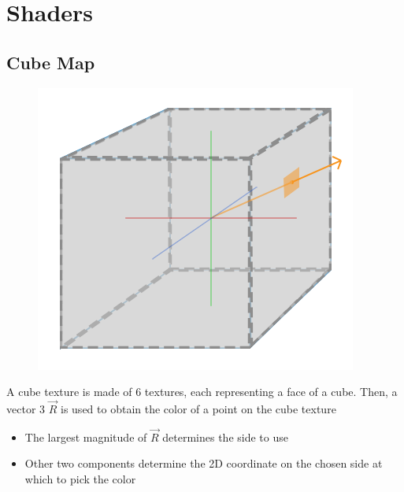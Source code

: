 \section{Shaders}

\subsection{Cube Map}

  \begin{figure}[H]
    \centering
    \includegraphics[width=0.4\columnwidth]{images/textures/shaders/cube-map.png}
  \end{figure}

  A cube texture is made of 6 textures, each representing a face of a cube.
  Then, a vector 3 $ \vec{R} $ is used to obtain the color of a point on the
  cube texture

  \begin{itemize}
    \item The largest magnitude of $ \vec{R} $ determines the side to use
    \item Other two components determine the 2D coordinate on the chosen side
    at which to pick the color
  \end{itemize}
